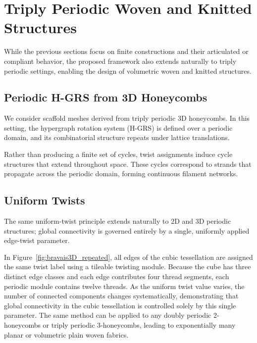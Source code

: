\documentclass[acmtog,anonymous,review]{acmart}
\begin{document}
\section{Triply Periodic Woven and Knitted Structures}

While the previous sections focus on finite constructions and their
articulated or compliant behavior, the proposed framework also extends
naturally to triply periodic settings, enabling the design of volumetric
woven and knitted structures.

\subsection{Periodic H-GRS from 3D Honeycombs}

We consider scaffold meshes derived from triply periodic 3D honeycombs.
In this setting, the hypergraph rotation system (H-GRS) is defined over
a periodic domain, and its combinatorial structure repeats under lattice
translations.

Rather than producing a finite set of cycles, twist assignments induce
cycle structures that extend throughout space. These cycles correspond
to strands that propagate across the periodic domain, forming continuous
filament networks.

\subsection{Uniform Twists}

The same uniform-twist principle extends naturally to 2D and 3D periodic structures; global connectivity is governed entirely by a single, uniformly applied edge-twist parameter.

In Figure~\ref{fig:bravais3D_repeated}, all edges of the cubic tessellation are assigned the same twist label using a tileable twisting module. Because the cube has three distinct edge classes and each edge contributes four thread segments, each periodic module contains twelve threads. As the uniform twist value varies, the number of connected components changes systematically, demonstrating that global connectivity in the cubic tessellation is controlled solely by this single parameter. The same method can be applied to any doubly periodic 2-honeycombs or triply periodic 3-honeycombs, leading to exponentially many planar or volumetric plain woven fabrics.
\end{document}
